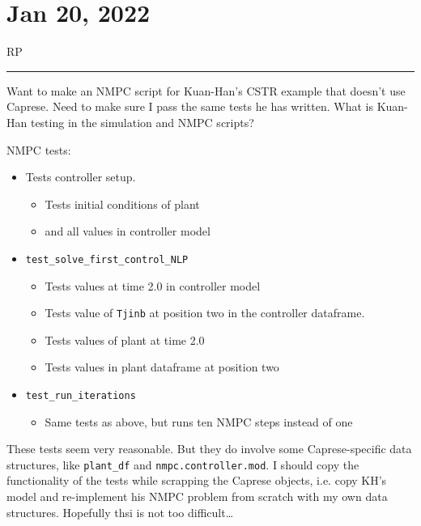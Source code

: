 \documentclass{article}
\newcommand{\RP}{\vspace{0.5cm}RP\vspace{0.2cm}\hrule\vspace{0.2cm}}
\begin{document}
\section{Jan 20, 2022}

\RP
Want to make an NMPC script for Kuan-Han's CSTR example that doesn't use
Caprese. Need to make sure I pass the same tests he has written.
What is Kuan-Han testing in the simulation and NMPC scripts?

NMPC tests:
\begin{itemize}
  \item Tests controller setup.
    \begin{itemize}
      \item  Tests initial conditions of plant
      \item  and all values in controller model
    \end{itemize}
  \item \texttt{test\_solve\_first\_control\_NLP}
    \begin{itemize}
      \item Tests values at time 2.0 in controller model
      \item Tests value of \texttt{Tjinb} at position two in the controller
        dataframe.
      \item Tests values of plant at time 2.0
      \item Tests values in plant dataframe at position two
    \end{itemize}
  \item \texttt{test\_run\_iterations}
    \begin{itemize}
      \item Same tests as above, but runs ten NMPC steps instead of one
    \end{itemize}
\end{itemize}
These tests seem very reasonable. But they do involve some Caprese-specific data
structures, like \texttt{plant\_df} and \texttt{nmpc.controller.mod}.
I should copy the functionality of the tests while scrapping the Caprese
objects, i.e. copy KH's model and re-implement his NMPC problem from scratch
with my own data structures.
Hopefully thsi is not too difficult\ldots
\end{document}
